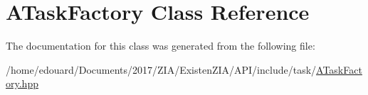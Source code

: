 \hypertarget{classATaskFactory}{}\section{A\+Task\+Factory Class Reference}
\label{classATaskFactory}


The documentation for this class was generated from the following file\+:\begin{DoxyCompactItemize}
\item 
/home/edouard/\+Documents/2017/\+Z\+I\+A/\+Existen\+Z\+I\+A/\+A\+P\+I/include/task/\mbox{\hyperlink{ATaskFactory_8hpp}{A\+Task\+Factory.\+hpp}}\end{DoxyCompactItemize}
